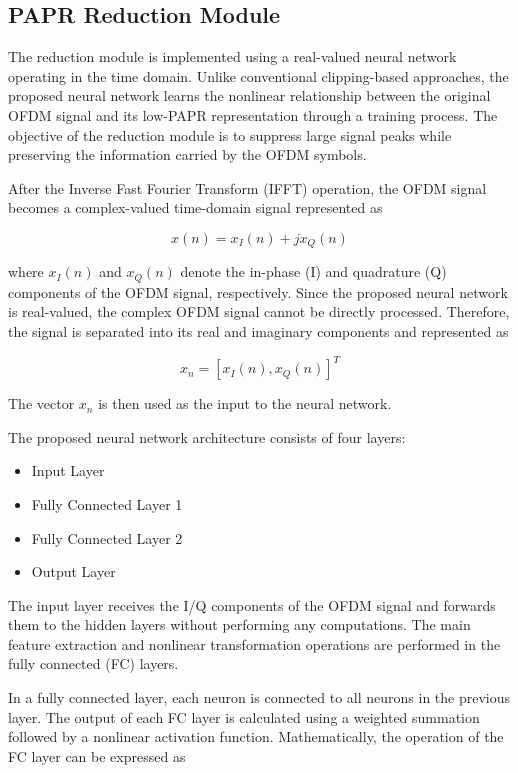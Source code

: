 \subsection{PAPR Reduction Module}

The reduction module is implemented using a real-valued neural network operating in the time domain. Unlike conventional clipping-based approaches, the proposed neural network learns the nonlinear relationship between the original OFDM signal and its low-PAPR representation through a training process. The objective of the reduction module is to suppress large signal peaks while preserving the information carried by the OFDM symbols.

After the Inverse Fast Fourier Transform (IFFT) operation, the OFDM signal becomes a complex-valued time-domain signal represented as

\begin{equation*}
    x(n)=x_I(n)+j x_Q(n)
\end{equation*}

where $x_I(n)$ and $x_Q(n)$ denote the in-phase (I) and quadrature (Q) components of the OFDM signal, respectively. Since the proposed neural network is real-valued, the complex OFDM signal cannot be directly processed. Therefore, the signal is separated into its real and imaginary components and represented as

\begin{equation*}
    x_n=[x_I(n),x_Q(n)]^T
\end{equation*}

The vector $x_n$ is then used as the input to the neural network.

The proposed neural network architecture consists of four layers:

\begin{itemize}
    \item Input Layer
    \item Fully Connected Layer 1
    \item Fully Connected Layer 2
    \item Output Layer
\end{itemize}

The input layer receives the I/Q components of the OFDM signal and forwards them to the hidden layers without performing any computations. The main feature extraction and nonlinear transformation operations are performed in the fully connected (FC) layers.

In a fully connected layer, each neuron is connected to all neurons in the previous layer. The output of each FC layer is calculated using a weighted summation followed by a nonlinear activation function. Mathematically, the operation of the FC layer can be expressed as

